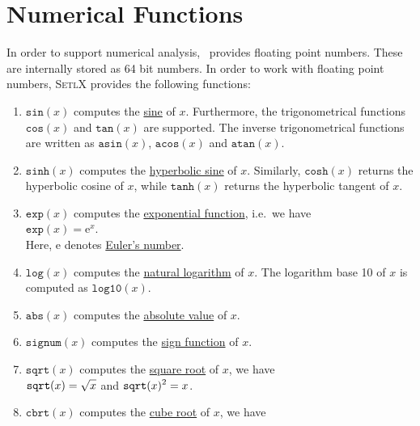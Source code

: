 \section{Numerical Functions}
In order to support numerical analysis, \setlx\ provides floating point numbers.  These are internally stored
as 64 bit numbers.  In order to work with floating point numbers,  \textsc{SetlX} provides the following functions:
\begin{enumerate}
\item $\texttt{sin}(x)$ computes the \href{https://en.wikipedia.org/wiki/Sine}{sine} of $x$.
      Furthermore, the trigonometrical functions $\texttt{cos}(x)$ and $\texttt{tan}(x)$ are supported.  The
      inverse trigonometrical functions are written as 
      $\texttt{asin}(x)$, $\texttt{acos}(x)$ and $\texttt{atan}(x)$.    
\item $\texttt{sinh}(x)$ computes the \href{https://en.wikipedia.org/wiki/Hyperbolic_function}{hyperbolic sine} of $x$.
      Similarly,  $\mathtt{cosh}(x)$ returns the hyperbolic cosine of $x$, while
      $\mathtt{tanh}(x)$ returns the hyperbolic tangent of $x$.
\item $\texttt{exp}(x)$ computes the \href{https://en.wikipedia.org/wiki/Exponential_function}{exponential
      function}, i.e.~we have 
      \\[0.2cm]
      \hspace*{1.3cm}
      $\texttt{exp}(x) = \mathrm{e}^x$.
      \\[0.2cm]
      Here, $\mathrm{e}$ denotes \href{https://en.wikipedia.org/wiki/E_(mathematical_constant)}{Euler's number}.
\item $\texttt{log}(x)$ computes the \href{https://en.wikipedia.org/wiki/Natural_logarithm}{natural logarithm} of  $x$.
      The logarithm base 10 of $x$ is computed as $\mathtt{log10}(x)$.
\item $\texttt{abs}(x)$ computes the \href{https://en.wikipedia.org/wiki/Absolute_value}{absolute value} of $x$.
\item $\mathtt{signum}(x)$ computes the \href{https://en.wikipedia.org/wiki/Sign_function}{sign function} of $x$.
\item $\texttt{sqrt}(x)$ computes the \href{https://en.wikipedia.org/wiki/Square_root}{square root} of $x$, we have
      \\[0.2cm]
      \hspace*{1.3cm}
      $\displaystyle\texttt{sqrt}(x) = \sqrt{x}$ \quad and \quad $\displaystyle \texttt{sqrt}(x)^2 = x$.
\item $\texttt{cbrt}(x)$ computes the \href{https://en.wikipedia.org/wiki/Cube_root}{cube root} of $x$, we have

\end{enumerate}

